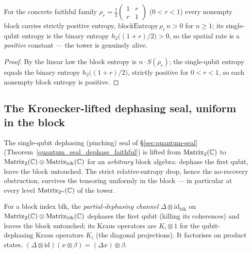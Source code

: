 \begin{theorem}\label{blockEntropy_rhoR_pos}
  \leanok
  For the concrete faithful family
  \(\rho_r = \tfrac12\!\left(\begin{smallmatrix}1 & r\\ r & 1\end{smallmatrix}\right)\)
  (\(0 < r < 1\)) every nonempty block carries strictly positive entropy,
  \(\mathrm{blockEntropy}\,\rho_r\,n > 0\) for \(n\ge 1\); its single-qubit entropy is the binary
  entropy \(h_2\!\big((1+r)/2\big) > 0\), so the spatial rate is a \emph{positive} constant --- the
  tower is genuinely alive.
\end{theorem}
\begin{proof}\leanok
  By the linear law the block entropy is \(n\cdot S(\rho_r)\); the single-qubit entropy equals the
  binary entropy \(h_2\!\big((1+r)/2\big)\), strictly positive for \(0 < r < 1\), so each nonempty
  block entropy is positive.
\end{proof}

\subsection{The Kronecker-lifted dephasing seal, uniform in the block}

The single-qubit dephasing (pinching) seal of \S\ref{sec:quantum-seal}
(Theorem~\ref{quantum_seal_dephase_faithful}) is lifted from \(\operatorname{Matrix}_2(\mathbb{C})\) to
\(\operatorname{Matrix}_2(\mathbb{C})\otimes\operatorname{Matrix}_{\mathrm{blk}}(\mathbb{C})\) for an \emph{arbitrary} block algebra: dephase the
first qubit, leave the block untouched. The strict relative-entropy drop, hence the no-recovery
obstruction, survives the tensoring uniformly in the block --- in particular at every level
\(\operatorname{Matrix}_{2^{n}}(\mathbb{C})\) of the tower.

\begin{definition}\label{dephaseKronId}
  \leanok
  For a block index \(\mathrm{blk}\), the \emph{partial-dephasing channel}
  \(\Delta\otimes\mathrm{id}_{\mathrm{blk}}\) on \(\operatorname{Matrix}_2(\mathbb{C})\otimes\operatorname{Matrix}_{\mathrm{blk}}(\mathbb{C})\)
  dephases the first qubit (killing its coherences) and leaves the block untouched; its Kraus
  operators are \(K_i\otimes 1\) for the qubit-dephasing Kraus operators \(K_i\) (the diagonal
  projections). It factorises on product states, \((\Delta\otimes\mathrm{id})(x\otimes\beta)
  = (\Delta x)\otimes\beta\).
\end{definition}

